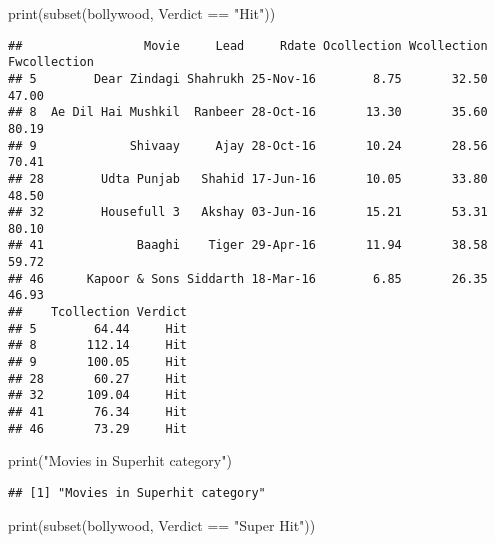 \documentclass[
]{article}
\newenvironment{Shaded}{\begin{snugshade}}{\end{snugshade}}
\newcommand{\FunctionTok}[1]{\textcolor[rgb]{0.00,0.00,0.00}{#1}}
\newcommand{\NormalTok}[1]{#1}
\newcommand{\SpecialCharTok}[1]{\textcolor[rgb]{0.00,0.00,0.00}{#1}}
\newcommand{\StringTok}[1]{\textcolor[rgb]{0.31,0.60,0.02}{#1}}
\begin{document}
\begin{Shaded}
\begin{Highlighting}[]
\FunctionTok{print}\NormalTok{(}\FunctionTok{subset}\NormalTok{(bollywood, Verdict }\SpecialCharTok{==} \StringTok{"Hit"}\NormalTok{))}
\end{Highlighting}
\end{Shaded}

\begin{verbatim}
##                 Movie     Lead     Rdate Ocollection Wcollection Fwcollection
## 5        Dear Zindagi Shahrukh 25-Nov-16        8.75       32.50        47.00
## 8  Ae Dil Hai Mushkil  Ranbeer 28-Oct-16       13.30       35.60        80.19
## 9             Shivaay     Ajay 28-Oct-16       10.24       28.56        70.41
## 28        Udta Punjab   Shahid 17-Jun-16       10.05       33.80        48.50
## 32        Housefull 3   Akshay 03-Jun-16       15.21       53.31        80.10
## 41             Baaghi    Tiger 29-Apr-16       11.94       38.58        59.72
## 46      Kapoor & Sons Siddarth 18-Mar-16        6.85       26.35        46.93
##    Tcollection Verdict
## 5        64.44     Hit
## 8       112.14     Hit
## 9       100.05     Hit
## 28       60.27     Hit
## 32      109.04     Hit
## 41       76.34     Hit
## 46       73.29     Hit
\end{verbatim}

\begin{Shaded}
\begin{Highlighting}[]
\FunctionTok{print}\NormalTok{(}\StringTok{"Movies in Superhit category"}\NormalTok{)}
\end{Highlighting}
\end{Shaded}

\begin{verbatim}
## [1] "Movies in Superhit category"
\end{verbatim}

\begin{Shaded}
\begin{Highlighting}[]
\FunctionTok{print}\NormalTok{(}\FunctionTok{subset}\NormalTok{(bollywood, Verdict }\SpecialCharTok{==} \StringTok{"Super Hit"}\NormalTok{))}
\end{Highlighting}
\end{Shaded}
\end{document}

